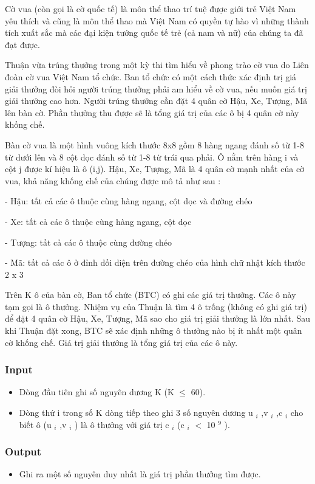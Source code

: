 

Cờ vua (còn gọi là cờ quốc tế) là môn thể thao trí tuệ được giới trẻ Việt Nam yêu thích và cũng là môn thể thao mà Việt Nam có quyền tự hào vì những thành tích xuất sắc mà các đại kiện tướng quốc tế trẻ (cả nam và nữ) của chúng ta đã đạt được.

Thuận vừa trúng thưởng trong một kỳ thi tìm hiểu về phong trào cờ vua do Liên đoàn cờ vua Việt Nam tổ chức. Ban tổ chức có một cách thức xác định trị giá giải thưởng đòi hỏi người trúng thưởng phải am hiểu về cờ vua, nếu muốn giá trị giải thưởng cao hơn. Người trúng thưởng cần đặt 4 quân cờ Hậu, Xe, Tượng, Mã lên bàn cờ. Phần thưởng thu được sẽ là tổng giá trị của các ô bị 4 quân cờ này khống chế.

Bàn cờ vua là một hình vuông kích thước 8x8 gồm 8 hàng ngang đánh số từ 1-8 từ dưới lên và 8 cột dọc đánh số từ 1-8 từ trái qua phải. Ô nằm trên hàng i và cột j được kí hiệu là ô (i,j). Hậu, Xe, Tượng, Mã là 4 quân cờ mạnh nhất của cờ vua, khả năng khống chế của chúng được mô tả như sau :

- Hậu: tất cả các ô thuộc cùng hàng ngang, cột dọc và đường chéo

- Xe: tất cả các ô thuộc cùng hàng ngang, cột dọc

- Tượng: tất cả các ô thuộc cùng đường chéo

- Mã: tất cả các ô ở đỉnh dối diện trên đường chéo của hình chữ nhật kích thước 2 x 3

Trên K ô của bàn cờ, Ban tổ chức (BTC) có ghi các giá trị thưởng. Các ô này tạm gọi là ô thưởng. Nhiệm vụ của Thuận là tìm 4 ô trống (không có ghi giá trị) để đặt 4 quân cờ Hậu, Xe, Tượng, Mã sao cho giá trị giải thưởng là lớn nhất. Sau khi Thuận đặt xong, BTC sẽ xác định những ô thưởng nào bị ít nhất một quân cờ khống chế. Giá trị giải thưởng là tổng giá trị của các ô này.

\subsubsection{Input}
\begin{itemize}
	\item Dòng đầu tiên ghi số nguyên dương K (K  $\le$  60).
	\item Dòng thứ i trong số K dòng tiếp theo ghi 3 số nguyên dương u $_ i $ ,v $_ i $ ,c $_ i $ cho biết ô (u $_ i $ ,v $_ i $ ) là ô thưởng với giá trị c $_ i $ (c $_ i $ $<$ 10 $^ 9 $ ).
\end{itemize}

\subsubsection{Output}
\begin{itemize}
	\item Ghi ra một số nguyên duy nhất là giá trị phần thưởng tìm được.
\end{itemize}

